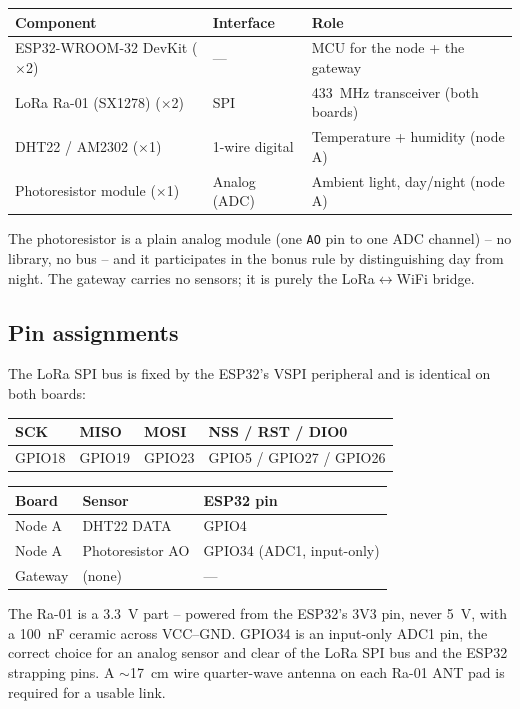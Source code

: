 \documentclass[11pt,a4paper]{article}
\newcommand{\note}[1]{\par\medskip\noindent\colorbox{soft}{\parbox{\dimexpr\linewidth-2\fboxsep}{\small #1}}\medskip\par}
\begin{document}
\begin{longtable}{@{}llp{7.2cm}@{}}
\toprule
\textbf{Component} & \textbf{Interface} & \textbf{Role}\\
\midrule\endhead
ESP32-WROOM-32 DevKit ($\times$2) & ---       & MCU for the node + the gateway\\
LoRa Ra-01 (SX1278) ($\times$2)   & SPI       & 433~MHz transceiver (both boards)\\
DHT22 / AM2302 ($\times$1)        & 1-wire digital & Temperature + humidity (node A)\\
Photoresistor module ($\times$1)  & Analog (ADC) & Ambient light, day/night (node A)\\
\bottomrule
\end{longtable}

The photoresistor is a plain analog module (one \texttt{AO} pin to one
ADC channel) -- no library, no bus -- and it participates in the bonus
rule by distinguishing day from night. The gateway carries no sensors;
it is purely the LoRa$\leftrightarrow$WiFi bridge.

\subsection{Pin assignments}

The LoRa SPI bus is fixed by the ESP32's VSPI peripheral and is
identical on both boards:

\begin{center}\begin{tabular}{@{}llll@{}}
\toprule
SCK & MISO & MOSI & NSS / RST / DIO0\\
\midrule
GPIO18 & GPIO19 & GPIO23 & GPIO5 / GPIO27 / GPIO26\\
\bottomrule
\end{tabular}\end{center}

\begin{center}\begin{tabular}{@{}lll@{}}
\toprule
\textbf{Board} & \textbf{Sensor} & \textbf{ESP32 pin}\\
\midrule
Node A & DHT22 DATA          & GPIO4 \\
Node A & Photoresistor AO    & GPIO34 (ADC1, input-only) \\
Gateway & (none)             & --- \\
\bottomrule
\end{tabular}\end{center}

\note{The Ra-01 is a 3.3~V part -- powered from the ESP32's 3V3 pin,
never 5~V, with a 100~nF ceramic across VCC--GND. GPIO34 is an
input-only ADC1 pin, the correct choice for an analog sensor and clear
of the LoRa SPI bus and the ESP32 strapping pins. A $\sim$17~cm wire
quarter-wave antenna on each Ra-01 ANT pad is required for a usable
link.}
\end{document}
